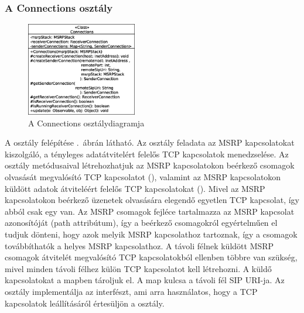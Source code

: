 \newpage
\subsubsection*{A Connections osztály}
\label{sec:msrp_connections}

\begin{figure}
  \vspace{-15pt}
  \begin{center}
    \includegraphics[width=0.43\textwidth]{img/class_diagrams/Connections.eps}
  \end{center}
  \vspace{-15pt}
  \captionsetup{font=scriptsize}
  \caption{A Connections osztálydiagramja}
   \label{fig:class_connections}
  \vspace{-10pt}
\end{figure}
A  osztály felépítése .~ábrán látható. Az osztály feladata az MSRP kapcsolatokat kiszolgáló, a tényleges adatátvitelért felelős TCP kapcsolatok menedzselése. Az osztály metódusaival létrehozhatjuk az MSRP kapcsolatokon beérkező csomagok olvasását megvalósító TCP kapcsolatot (), valamint az MSRP kapcsolatokon küldött adatok átviteléért felelős TCP kapcsolatokat (). Mivel az MSRP kapcsolatokon beérkező üzenetek olvasására elegendő egyetlen TCP kapcsolat, így abból csak egy van. Az MSRP csomagok fejléce tartalmazza az MSRP kapcsolat azonosítóját (path attribútum), így a beérkező csomagokról egyértelműen el tudjuk dönteni, hogy azok melyik MSRP kapcsolathoz tartoznak, így a csomagok továbbíthatók a helyes MSRP kapcsolathoz. A távoli félnek küldött MSRP csomagok átvitelét megvalósító TCP kapcsolatokból ellenben többre van szükség, mivel minden távoli félhez külön TCP kapcsolatot kell létrehozni. A küldő kapcsolatokat a  mapben tároljuk el. A map kulcsa a távoli fél SIP URI-ja. Az osztály implementálja az  interfészt, ami arra használatos, hogy a TCP kapcsolatok leállításáról értesüljön a  osztály.


